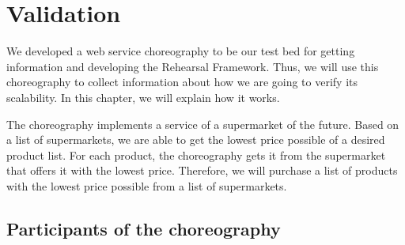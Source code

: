\section{Validation}

We developed a web service choreography to be our test bed for getting information and developing the Rehearsal Framework. Thus, we will use this choreography to collect information about how we are going to verify its scalability. In this chapter, we will explain how it works.

The choreography implements a service of a supermarket of the future. Based on a list of supermarkets, we are able to get the lowest price possible of a desired product list. For each product, the choreography gets it from the supermarket that offers it with the lowest price. Therefore, we will purchase a list of products with the lowest price possible from a list of supermarkets.

\subsection{Participants of the choreography}
\label{participantschoreography}


